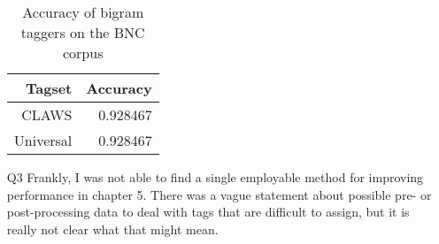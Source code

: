 \documentclass{article}
\begin{document}
\begin{itemize}
    \begin{table}[tbh]
      \caption{Accuracy of bigram taggers on the BNC corpus}
      \label{tab:clawsuniversal}
      \centering
      \begin{tabular}{r | r}
        Tagset    & Accuracy \\
        \hline
        CLAWS     & 0.928467 \\
        Universal & 0.928467
      \end{tabular}
    \end{table}
    \item[Q3] Frankly, I was not able to find a single employable method for improving performance in chapter 5. There was a vague statement about possible pre- or post-processing data to deal with tags that are difficult to assign, but it is really not clear what that might mean.
  \end{itemize}
\end{document}
